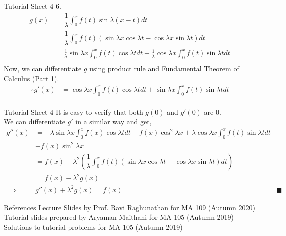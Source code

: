 \documentclass[aspectratio=169]{beamer}
\begin{document}
\begin{frame}{Tutorial Sheet 4}
	6. 
	\begin{align*}
		g(x) &= \dfrac{1}{\lambda}\int_{0}^{x} f(t)\sin \lambda(x - t) dt\\
		&= \dfrac{1}{\lambda}\int_{0}^{x} f(t) \left(\sin \lambda x\cos \lambda t - \cos \lambda x \sin \lambda t\right) dt\\
		&= \frac{1}{\lambda}\sin\lambda x\int_{0}^{x} f(t)\cos \lambda t dt - \frac{1}{\lambda}\cos \lambda x \int_{0}^{x} f(t)\sin \lambda t dt \\
	\end{align*}
	Now, we can differentiate $g$ using product rule and Fundamental Theorem of Calculus (Part 1).
	\begin{align*}
	\therefore g'(x) %
	&= \cos\lambda x\int_{0}^{x} f(t)\cos \lambda t dt + \sin \lambda x \int_{0}^{x} f(t)\sin \lambda t dt \\
	\end{align*}
\end{frame}
		
\begin{frame}{Tutorial Sheet 4}
	It is easy to verify that both $g(0)$ and $g'(0)$ are 0.\\
	We can differentiate $g'$ in a similar way and get,
	\begin{align*}
		g''(x) &= -\lambda\sin\lambda x\int_{0}^{x} f(x)\cos \lambda t dt + f(x)\cos^2\lambda x + \lambda \cos \lambda x \int_{0}^{x} f(t)\sin \lambda t dt \\
		& + f(x)\sin^2 \lambda x\\
		&= f(x) - \lambda^2\left(\dfrac{1}{\lambda}\int_{0}^{x} f(t) \left(\sin \lambda x\cos \lambda t - \cos \lambda x \sin \lambda t\right) dt\right)\\
		&= f(x) - \lambda^2g(x)\\
		\implies & g''(x) + \lambda^2g(x) = f(x) & \blacksquare
	\end{align*}
\end{frame}

\begin{frame}{References}
    Lecture Slides by Prof. Ravi Raghunathan for MA 109 (Autumn 2020) \\
    Tutorial slides prepared by Aryaman Maithani for MA 105 (Autumn 2019) \\
    Solutions to tutorial problems for MA 105 (Autumn 2019) \\
\end{frame}
\end{document}
